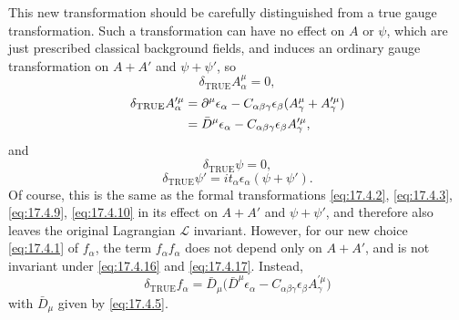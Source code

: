 This new transformation should be carefully distinguished from a true gauge
transformation. Such a transformation can have no effect on $A$ or $\psi$,
which are just prescribed classical background fields, and induces an
ordinary gauge transformation on $A+A'$ and $\psi+\psi'$, so
\begin{equation}
\delta_{\mathrm{TRUE}}A_\alpha^\mu=0,
\label{eq:17.4.16}
\end{equation}
\begin{align}
\delta_{\mathrm{TRUE}}A_\alpha^{\prime\mu}
&=\partial^\mu\epsilon_\alpha
-C_{\alpha\beta\gamma}\epsilon_\beta
(A_\gamma^\mu+A_\gamma^{\prime\mu}) \notag\\
&=\bar D^\mu\epsilon_\alpha
-C_{\alpha\beta\gamma}\epsilon_\beta A_\gamma^{\prime\mu},
\label{eq:17.4.17}
\end{align}
and
\begin{equation}
\delta_{\mathrm{TRUE}}\psi=0,
\label{eq:17.4.18}
\end{equation}
\begin{equation}
\delta_{\mathrm{TRUE}}\psi'
=it_\alpha\epsilon_\alpha(\psi+\psi').
\label{eq:17.4.19}
\end{equation}
Of course, this is the same as the formal transformations
\eqref{eq:17.4.2}, \eqref{eq:17.4.3}, \eqref{eq:17.4.9},
\eqref{eq:17.4.10} in its effect on $A+A'$ and $\psi+\psi'$, and therefore
also leaves the original Lagrangian $\mathcal L$ invariant. However, for our
new choice \eqref{eq:17.4.1} of $f_\alpha$, the term $f_\alpha f_\alpha$ does
not depend only on $A+A'$, and is not invariant under \eqref{eq:17.4.16}
and \eqref{eq:17.4.17}. Instead,
\begin{equation}
\delta_{\mathrm{TRUE}}f_\alpha
=\bar D_\mu\bigl(\bar D^\mu\epsilon_\alpha
-C_{\alpha\beta\gamma}\epsilon_\beta A_\gamma^{\prime\mu}\bigr)
\label{eq:17.4.20}
\end{equation}
with $\bar D_\mu$ given by \eqref{eq:17.4.5}.

